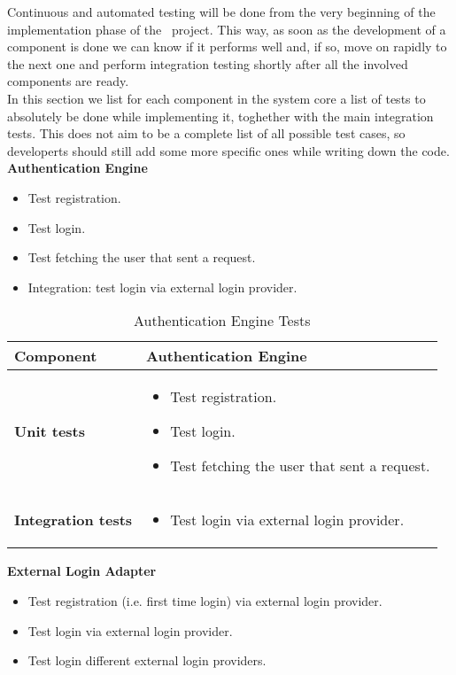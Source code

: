 Continuous and automated testing will be done from the very beginning of the implementation phase of the \projectname~project. This way, as soon as the development of a component is done we can know if it performs well and, if so, move on rapidly to the next one and perform integration testing shortly after all the involved components are ready. \\
In this section we list for each component in the system core a list of tests to absolutely be done while implementing it, toghether with the main integration tests. This does not aim to be a complete list of all possible test cases, so developerts should still add some more specific ones while writing down the code. \\ [1cm]

\textbf{Authentication Engine}

\begin{itemize}
\item Test registration.
\item Test login.
\item Test fetching the user that sent a request.
\item Integration: test login via external login provider.
\end{itemize}

\begin{table}[H]	
	\centering
	\def\arraystretch{1.5}
	\begin{tabular}{|m{4cm}|m{12cm}|}
		\hline
		\textbf{Component} & Authentication Engine \\ \hline
		\textbf{Unit tests} & 
			\begin{itemize}
			\item Test registration.
			\item Test login.
			\item Test fetching the user that sent a request.
			\end{itemize} \\ \hline
		\textbf{Integration tests} &
			\begin{itemize} 
			\item Test login via external login provider. 
			\end{itemize} \\ \hline
	\end{tabular}
	\caption{Authentication Engine Tests}
\end{table}

\textbf{External Login Adapter}

\begin{itemize}
\item Test registration (i.e. first time login) via external login provider.
\item Test login via external login provider.
\item Test login different external login providers.
\end{itemize}


